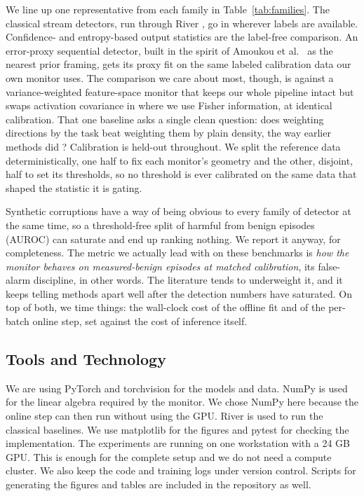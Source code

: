 \documentclass[graybox]{SNmult}
\begin{document}
 We line up one representative from each family in
Table~\ref{tab:families}. The classical stream detectors, run through
River \cite{montiel2021river}, go in wherever labels are available.
Confidence- and entropy-based output statistics \cite{hendrycks2017baseline,
garg2022atc} are the label-free comparison. An error-proxy sequential
detector, built in the spirit of Amoukou et al.\
\cite{amoukou2024sequential} as the nearest prior framing, gets its
proxy fit on the same labeled calibration data our own monitor uses. The
comparison we care about most, though, is against a variance-weighted
feature-space monitor that keeps our whole pipeline intact but swaps
activation covariance in where we use Fisher information, at identical
calibration. That one baseline asks a single clean question: does
weighting directions by the task beat weighting them by plain density,
the way earlier methods did \cite{lee2018mahalanobis}? Calibration is
held-out throughout. We split the reference data deterministically, one
half to fix each monitor's geometry and the other, disjoint, half to set
its thresholds, so no threshold is ever calibrated on the same data that
shaped the statistic it is gating.

 Synthetic corruptions have a way of being obvious
to every family of detector at the same time, so a threshold-free split
of harmful from benign episodes (AUROC) can saturate and end up ranking
nothing. We report it anyway, for completeness. The metric we actually
lead with on these benchmarks is \emph{how the monitor behaves on
measured-benign episodes at matched calibration}, its false-alarm
discipline, in other words. The literature tends to underweight it, and
it keeps telling methods apart well after the detection numbers have
saturated. On top of both, we time things: the wall-clock cost of the
offline fit and of the per-batch online step, set against the cost of
inference itself.

\subsection{Tools and Technology}

We are using PyTorch and torchvision for the models and data. NumPy is used for the linear algebra required by the monitor. We chose NumPy here because the online step can then run without using the GPU. River \cite{montiel2021river} is used to run the classical baselines. We use matplotlib for the figures and pytest for checking the implementation. The experiments are running on one workstation with a 24 GB GPU. This is enough for the complete setup and we do not need a compute cluster. We also keep the code and training logs under version control. Scripts for generating the figures and tables are included in the repository as well.
\end{document}
